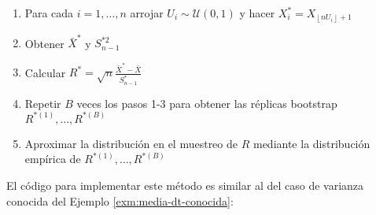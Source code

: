 \documentclass[
]{book}
\theoremstyle{break}
\theoremstyle{definition}
\theoremstyle{definition}
\theoremstyle{definition}
\theoremstyle{definition}
\theoremstyle{remark}
\begin{document}
\begin{enumerate}
\def\labelenumi{\arabic{enumi}.}
\item
  Para cada \(i=1,\ldots ,n\) arrojar \(U_i\sim \mathcal{U}\left( 0,1 \right)\) y
  hacer \(X_i^{\ast}=X_{\left\lfloor nU_i\right\rfloor +1}\)
\item
  Obtener \(\bar{X}^{\ast}\) y \(S_{n-1}^{\ast 2}\)
\item
  Calcular
  \(R^{\ast}=\sqrt{n}\frac{\bar{X}^{\ast}-\bar{X}}{ S_{n-1}^{\ast}}\)
\item
  Repetir \(B\) veces los pasos 1-3 para obtener las réplicas bootstrap
  \(R^{\ast (1)}, \ldots, R^{\ast (B)}\)
\item
  Aproximar la distribución en el muestreo de \(R\) mediante la
  distribución empírica de \(R^{\ast (1)}, \ldots, R^{\ast (B)}\)
\end{enumerate}

El código para implementar este método es similar al del caso de varianza conocida
del Ejemplo \ref{exm:media-dt-conocida}:
\end{document}

